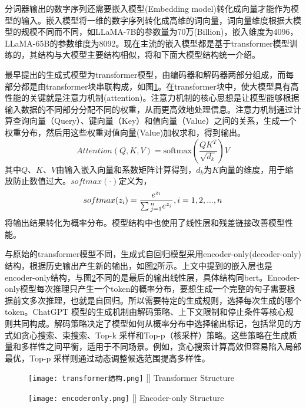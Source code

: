 分词器输出的数字序列还需要嵌入模型(Embedding model)转化成向量才能作为模型的输入。嵌入模型将一维的数字序列转化成高维的词向量，词向量维度根据大模型的规模不同而不同，如LLaMA-7B的参数量为70万(Billion)，嵌入维度为4096，LLaMA-65B的参数维度为8092。现在主流的嵌入模型都是基于transformer\cite{devlin2019bert}模型训练的，其结构与大模型主要结构相似，将和下面大模型结构统一介绍。

最早提出的生成式模型为transformer\cite{vaswani2017attention}模型，由编码器和解码器两部分组成，而每部分都是由transformer块串联构成，如图\ref{fig:transformer}。在transformer块中，使大模型具有高性能的关键就是注意力机制(attention)。注意力机制的核心思想是让模型能够根据输入数据的不同部分分配不同的权重，从而更高效地处理信息。注意力机制通过计算查询向量（Query）、键向量（Key）和值向量（Value）之间的关系，生成一个权重分布，然后用这些权重对值向量(Value)加权求和，得到输出。
\begin{equation}
  \label{eq:attention}
  Attention(Q,K,V) = \text{softmax}\left(\frac{QK^T}{\sqrt{d_k}}\right)V
\end{equation}
其中$Q$、$K$、$V$由输入嵌入向量和系数矩阵计算得到，$d_k$为$K$向量的维度，用于缩放防止数值过大。$softmax(\cdot )$定义为，
\begin{equation}
  \label{eq:softmax}
  softmax({z_i}) = \frac{{{e^{{z_i}}}}}{{\sum {_{j = 1}^n{e^{{z_j}}}} }},{\rm{  }}i = 1,2,...,n
\end{equation}
将输出结果转化为概率分布。模型结构中也使用了线性层和残差链接\cite{he2016deep}改善模型性能。

与原始的transformer模型不同，生成式自回归模型采用encoder-only(decoder-only)结构，根据历史输出产生新的输出，如图\ref{fig:encodel}所示。上文中提到的嵌入层也是encoder-only结构，与图\ref{fig:encodel}不同的是最后的输出线性层，具体结构同bert\cite{devlin2019bert}。Encoder-only模型每次推理只产生一个token的概率分布，要想生成一个完整的句子需要根据前文多次推理，也就是自回归。所以需要特定的生成规则，选择每次生成的哪个token。ChatGPT 模型的生成机制由解码策略、上下文限制和停止条件等核心规则共同构成。解码策略决定了模型如何从概率分布中选择输出标记，包括常见的方式如贪心搜索\cite{bahdanau2015neural}、束搜索\cite{sutskever2014sequence}、Top-k\cite{fan2018hierarchical} 采样和Top-p（核采样）\cite{holtzmancurious}策略。这些策略在生成质量和多样性之间平衡，适用于不同场景。例如，贪心搜索计算高效但容易陷入局部最优，Top-p 采样则通过动态调整候选范围提高多样性。
\begin{figure}[htbp]
  \centering
  \texttt{[image: transformer结构.png]}
  []{ Transformer Structure}
  \label{fig:transformer}
\end{figure}
\begin{figure}[!htbp]
  \centering
  \texttt{[image: encoderonly.png]}
  []{ Encoder-only Structure}
  \label{fig:encodel}
\end{figure}


